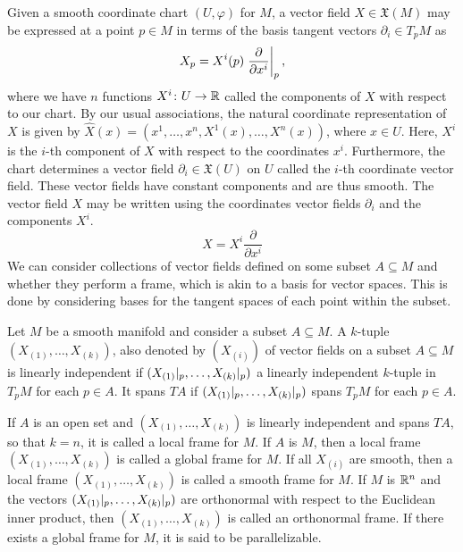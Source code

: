 \documentclass[a4paper,12pt]{article}
\begin{document}
Given a smooth coordinate chart $(U, \varphi)$ for $M$, a vector field $X \in \mathfrak{X}(M)$ may be expressed at a point $p \in M$ in terms of the basis tangent vectors $\partial_i \in T_p M$ as
\begin{equation}
    X_p = X^i(p) \eval{\frac{\partial}{\partial x^i}}{p},
\end{equation}
where we have $n$ functions $X^i \colon U \to \mathbb{R}$ called the components of $X$ with respect to our chart.
By our usual associations, the natural coordinate representation of $X$ is given by $\widehat{X}(x) = (x^1, \ldots, x^n, X^1(x), \ldots, X^n(x))$, where $x \in U$.
Here, $X^i$ is the $i$-th component of $X$ with respect to the coordinates $x^i$.
Furthermore, the chart determines a vector field $\partial_i \in \mathfrak{X}(U)$ on $U$ called the $i$-th coordinate vector field.
These vector fields have constant components and are thus smooth.
The vector field $X$ may be written using the coordinates vector fields $\partial_i$ and the components $X^i$.
\begin{equation}
    X = X^i \frac{\partial}{\partial x^i}
\end{equation}
We can consider collections of vector fields defined on some subset $A \subseteq M$ and whether they perform a frame, which is akin to a basis for vector spaces.
This is done by considering bases for the tangent spaces of each point within the subset.
\begin{definition}\label{def:frame_of_manifold}
    Let $M$ be a smooth manifold and consider a subset $A \subseteq M$.
    A $k$-tuple $(X_{(1)}, \ldots, X_{(k)})$, also denoted by $(X_{(i)})$ of vector fields on a subset $A \subseteq M$ is linearly independent if $(\eval*{X_{(1)}}{p}, \ldots, \eval*{X_{(k)}}{p})$ a linearly independent $k$-tuple in $T_p M$ for each $p \in A$.
    It spans $TA$ if $(\eval*{X_{(1)}}{p}, \ldots, \eval*{X_{(k)}}{p})$ spans $T_p M$ for each $p \in A$.
    
    If $A$ is an open set and $(X_{(1)}, \ldots, X_{(k)})$ is linearly independent and spans $TA$, so that $k = n$, it is called a local frame for $M$.
    If $A$ is $M$, then a local frame $(X_{(1)}, \ldots, X_{(k)})$ is called a global frame for $M$.
    If all $X_{(i)}$ are smooth, then a local frame $(X_{(1)}, \ldots, X_{(k)})$ is called a smooth frame for $M$.
    If $M$ is $\mathbb{R}^n$ and the vectors $(\eval*{X_{(1)}}{p}, \ldots, \eval*{X_{(k)}}{p})$ are orthonormal with respect to the Euclidean inner product, then $(X_{(1)}, \ldots, X_{(k)})$ is called an orthonormal frame.
    If there exists a global frame for $M$, it is said to be parallelizable.
\end{definition}
\end{document}
